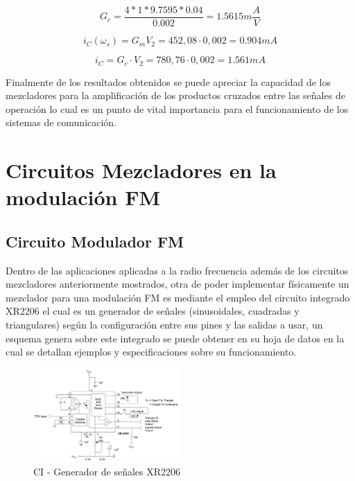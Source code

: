 \documentclass[conference]{IEEEtran}
\begin{document}
	
	\begin{equation}
		G_c = \frac{4*1*9.7595*0.04}{0.002} = 1.5615m\frac{A}{V}
	\end{equation}
	
	
	\begin{equation}
		i_C(\omega_s) = G_m V_2 = 452,08 \cdot 0,002 = 0.904mA
	\end{equation}
	
	\begin{equation}
	i_C = G_c \cdot V_2 = 780,76 \cdot 0,002 = 1.561mA
	\end{equation}
	
	Finalmente de los resultados obtenidos se puede apreciar la capacidad de los mezcladores para la amplificación de los productos cruzados entre las señales de operación lo cual es un punto de vital importancia para el funcionamiento de los sistemas de comunicación.
	
	
	\section{Circuitos Mezcladores en la modulación FM}
	
	\subsection{Circuito Modulador FM}
	
	Dentro de las aplicaciones aplicadas a la radio frecuencia además de los circuitos mezcladores anteriormente mostrados, otra de poder implementar físicamente un mezclador para una modulación FM es mediante el empleo del circuito integrado XR2206 el cual es un generador de señales (sinusoidales, cuadradas y triangulares) según la configuración entre sus pines y las salidas a usar, un esquema genera sobre este integrado se puede obtener en su hoja de datos en la cual se detallan ejemplos y especificaciones sobre su funcionamiento.
	
	\begin{figure}[h]
		\centering
		\includegraphics[width=0.5\textwidth]{media/integrado-xr2206}
		\caption{CI - Generador de señales XR2206}
		\label{fig:integrado-xr2206}
	\end{figure}
	
\end{document}
